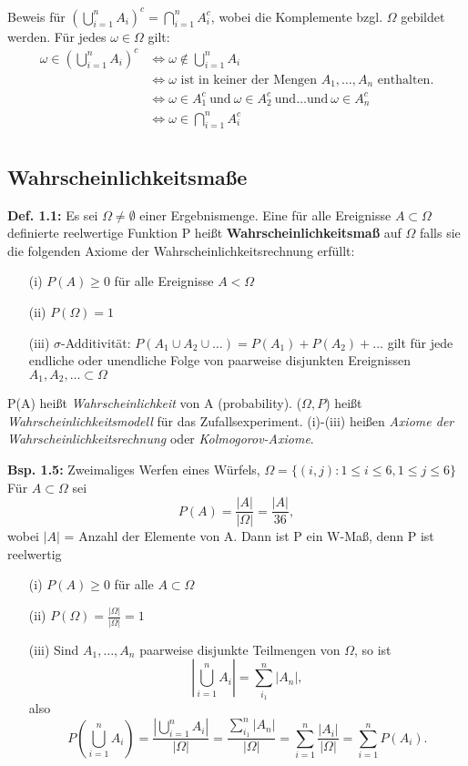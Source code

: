 \documentclass[a4paper,11pt]{article}
\begin{document}
\vspace{6pt}
\noindent Beweis für $(\bigcup_{i=1}^{n}A_i)^c = \bigcap_{i=1}^{n}A_i^c$, wobei die Komplemente bzgl. $\Omega$ gebildet werden.
\newline Für jedes $\omega\in\Omega$ gilt:
\begin{align*}
\omega\in(\bigcup_{i=1}^{n}A_i)^c &\Leftrightarrow \omega\notin\bigcup_{i=1}^{n}A_i\\
&\Leftrightarrow \omega\text{ ist in keiner der Mengen } A_1,\dots,A_n\text{ enthalten.}\\ 
&\Leftrightarrow \omega\in A_1^c\ \text{und}\ \omega\in A_2^c\ \text{und}\dots\text{und}\ \omega\in A_n^c\\
&\Leftrightarrow \omega\in\bigcap_{i=1}^{n}A_i^c\\
\end{align*}

\subsection{Wahrscheinlichkeitsmaße}

\noindent\textbf{Def. 1.1:} Es sei $\Omega\neq\emptyset$ einer Ergebnismenge. 
Eine für alle Ereignisse $A\subset\Omega$ definierte reelwertige Funktion P heißt \textbf{Wahrscheinlichkeitsmaß} auf $\Omega$ falls sie die folgenden Axiome der Wahrscheinlichkeitsrechnung erfüllt:
\begin{itemize}
    \item[(i)] $P(A)\geq0$ für alle Ereignisse $A<\Omega$
    \item[(ii)] $P(\Omega)=1$
    \item[(iii)] $\sigma$-Additivität: $P(A_1 \cup A_2\cup\dots) = P(A_1)+P(A_2)+\dots$ gilt für jede endliche oder unendliche Folge von paarweise disjunkten Ereignissen $A_1,A_2,\dots\subset\Omega$    
\end{itemize}

\noindent P(A) heißt \textit{Wahrscheinlichkeit} von A (probability). 
($\Omega,P$) heißt \textit{Wahrscheinlichkeitsmodell} für das Zufallsexperiment. 
(i)-(iii) heißen \textit{Axiome der Wahrscheinlichkeitsrechnung} oder \textit{Kolmogorov-Axiome}.

\vspace{6pt}
\noindent\textbf{Bsp. 1.5:} Zweimaliges Werfen eines Würfels, $\Omega = \{(i,j):1\leq i\leq6,1\leq j\leq6\}$
\newline Für $A\subset\Omega$ sei \[P(A)=\frac{|A|}{|\Omega|}=\frac{|A|}{36},\] wobei $|A|$ = Anzahl der Elemente von A. Dann ist P ein W-Maß, denn P ist reelwertig
\begin{itemize} 
    \item[(i)] $P(A) \geq0$ für alle $A\subset\Omega$
    \item[(ii)] $P(\Omega)=\frac{|\Omega|}{|\Omega|}=1$
    \item[(iii)] Sind $A_1,\dots,A_n$ paarweise disjunkte Teilmengen von $\Omega$, so ist \[|\bigcup_{i=1}^{n}A_i| = \sum_{i_1}^{n}|A_n|,\] 
also \[P(\bigcup_{i=1}^{n}A_i) = \frac{|\bigcup_{i=1}^{n}A_i|}{|\Omega|} = \frac{\sum_{i_1}^{n}|A_n|}{|\Omega|} = \sum_{i=1}^{n}\frac{|A_i|}{|\Omega|} = \sum_{i=1}^{n}P(A_i).\]
\end{itemize}
\end{document}
